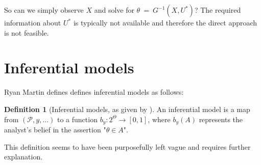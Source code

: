 \documentclass[
]{report}
\theoremstyle{definition}
\newtheorem{definition}{Definition}[section]
\begin{document}
So can we simply observe \(X\) and solve for
\(\theta \ = \ G^{-1}(X, U^*)\)? The required information about \(U^*\)
is typically not available and therefore the direct approach is not
feasible.

\section{Inferential models}

Ryan Martin defines defines inferential models as follows:

\begin{definition}[Inferential models, as given by \cite{martin_false_2019}]
An inferential model is a map from $(\mathscr{P}, y, \dots)$ to a function 
$b_y : 2^{\Theta} \to [0,1]$, where $b_y(A)$ represents the analyst's belief 
in the assertion "$\theta \in A$".
\end{definition}

This definition seems to have been purposefully left vague and requires
further explanation.


\printbibliography
\end{document}

